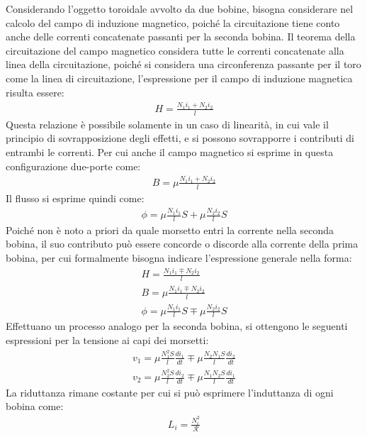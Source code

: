\documentclass{article}
\numberwithin{equation}{subsection}
\begin{document}
Considerando l'oggetto toroidale avvolto da due bobine, bisogna considerare nel calcolo del campo di induzione magnetico, poiché la circuitazione tiene conto anche delle 
correnti concatenate passanti per la seconda bobina. Il teorema della circuitazione del campo magnetico considera tutte le correnti concatenate alla linea della circuitazione, 
poiché si considera una circonferenza passante per il toro come la linea di circuitazione, l'espressione per il campo di induzione magnetica risulta essere:
\begin{gather*}
    H=\displaystyle\frac{N_1i_1+N_2i_2}{l}
\end{gather*}
Questa relazione è possibile solamente in un caso di linearità, in cui vale il principio di sovrapposizione degli effetti, e si possono sovrapporre i contributi di 
entrambi le correnti. 
Per cui anche il campo magnetico si esprime in questa configurazione due-porte come:
\begin{gather*}
    B=\mu\displaystyle\frac{N_1i_1+N_2i_2}{l}
\end{gather*}
Il flusso si esprime quindi come:
\begin{gather*}
    \phi=\mu\displaystyle\frac{N_1i_1}{l}S+\mu\frac{N_2i_2}{l}S
\end{gather*}
Poiché non è noto a priori da quale morsetto entri la corrente nella seconda bobina, il suo contributo può essere concorde o discorde alla corrente della prima bobina, per cui 
formalmente bisogna indicare l'espressione generale nella forma:
\begin{gather*}
    H=\displaystyle\frac{N_1i_1\mp N_2i_2}{l}\\
    B=\mu\displaystyle\frac{N_1i_1\mp N_2i_2}{l}\\
    \phi=\mu\displaystyle\frac{N_1i_1}{l}S\mp\mu\frac{N_2i_2}{l}S
\end{gather*}
Effettuano un processo analogo per la seconda bobina, si ottengono le seguenti espressioni per la tensione ai capi dei morsetti: 
\begin{gather*}
    v_1=\displaystyle\mu\frac{N_1^2S}{l}\frac{di_1}{dt}\mp\mu\frac{N_2N_1S}{l}\frac{di_2}{dt}\\
    v_2=\displaystyle\mu\frac{N_2^2S}{l}\frac{di_2}{dt}\mp\mu\frac{N_1N_2S}{l}\frac{di_1}{dt}
\end{gather*}
La riduttanza rimane costante per cui si può esprimere l'induttanza di ogni bobina come:
\begin{gather*}
    L_i=\displaystyle\frac{N_i^2}{\mathscr{R}}
\end{gather*}
\end{document}
